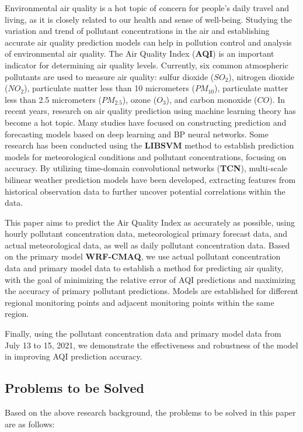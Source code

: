 \documentclass[12pt]{article}
\begin{document}
Environmental air quality is a hot topic of concern for people's daily travel and living, as it is closely related to our health and sense of well-being. Studying the variation and trend of pollutant concentrations in the air and establishing accurate air quality prediction models can help in pollution control and analysis of environmental air quality. The Air Quality Index (\textbf{AQI}) is an important indicator for determining air quality levels. Currently, six common atmospheric pollutants are used to measure air quality: sulfur dioxide ($SO_2$), nitrogen dioxide ($NO_2$), particulate matter less than 10 micrometers ($PM_{10}$), particulate matter less than 2.5 micrometers ($PM_{2.5}$), ozone ($O_3$), and carbon monoxide ($CO$). In recent years, research on air quality prediction using machine learning theory has become a hot topic. Many studies have focused on constructing prediction and forecasting models based on deep learning and BP neural networks. Some research has been conducted using the \textbf{LIBSVM} method to establish prediction models for meteorological conditions and pollutant concentrations, focusing on accuracy. By utilizing time-domain convolutional networks (\textbf{TCN}), multi-scale bilinear weather prediction models have been developed, extracting features from historical observation data to further uncover potential correlations within the data.

This paper aims to predict the Air Quality Index as accurately as possible,  using hourly pollutant concentration data, meteorological primary forecast data, and actual meteorological data, as well as daily pollutant concentration data. Based on the primary model \textbf{WRF-CMAQ}, we use actual pollutant concentration data and primary model data to establish a method for predicting air quality, with the goal of minimizing the relative error of AQI predictions and maximizing the accuracy of primary pollutant predictions. Models are established for different regional monitoring points and adjacent monitoring points within the same region. 

Finally, using the pollutant concentration data and primary model data from July 13 to 15, 2021, we demonstrate the effectiveness and robustness of the model in improving AQI prediction accuracy.

\subsection{Problems to be Solved}

Based on the above research background, the problems to be solved in this paper are as follows:
\end{document}
